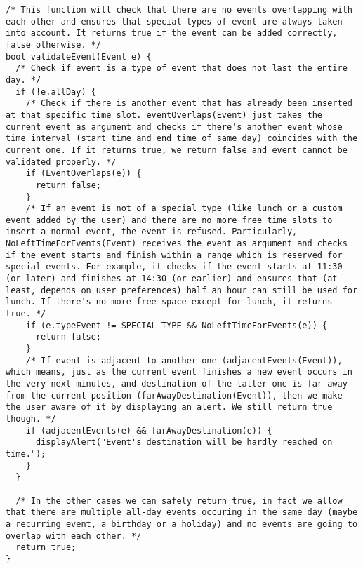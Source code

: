 \begin{tcolorbox}
\begin{verbatim}
/* This function will check that there are no events overlapping with each other and ensures that special types of event are always taken into account. It returns true if the event can be added correctly, false otherwise. */
bool validateEvent(Event e) {
  /* Check if event is a type of event that does not last the entire day. */
  if (!e.allDay) {
    /* Check if there is another event that has already been inserted at that specific time slot. eventOverlaps(Event) just takes the current event as argument and checks if there's another event whose time interval (start time and end time of same day) coincides with the current one. If it returns true, we return false and event cannot be validated properly. */
    if (EventOverlaps(e)) {
      return false;
    }
    /* If an event is not of a special type (like lunch or a custom event added by the user) and there are no more free time slots to insert a normal event, the event is refused. Particularly, NoLeftTimeForEvents(Event) receives the event as argument and checks if the event starts and finish within a range which is reserved for special events. For example, it checks if the event starts at 11:30 (or later) and finishes at 14:30 (or earlier) and ensures that (at least, depends on user preferences) half an hour can still be used for lunch. If there's no more free space except for lunch, it returns true. */
    if (e.typeEvent != SPECIAL_TYPE && NoLeftTimeForEvents(e)) {
      return false;
    }
    /* If event is adjacent to another one (adjacentEvents(Event)), which means, just as the current event finishes a new event occurs in the very next minutes, and destination of the latter one is far away from the current position (farAwayDestination(Event)), then we make the user aware of it by displaying an alert. We still return true though. */
    if (adjacentEvents(e) && farAwayDestination(e)) {
      displayAlert("Event's destination will be hardly reached on time.");
    }
  }
  
  /* In the other cases we can safely return true, in fact we allow that there are multiple all-day events occuring in the same day (maybe a recurring event, a birthday or a holiday) and no events are going to overlap with each other. */
  return true;
}
\end{verbatim}
\end{tcolorbox}

